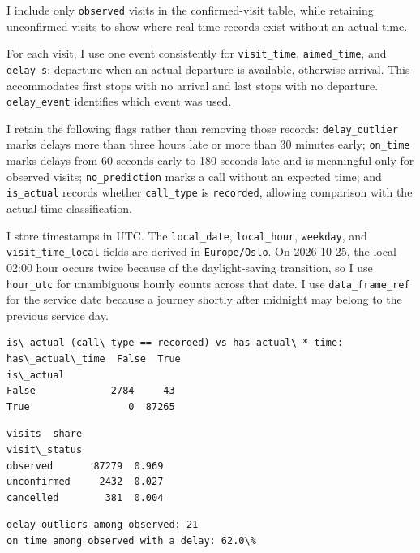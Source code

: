 \documentclass[11pt]{article}
\begin{document}
I include only \texttt{observed} visits in the confirmed-visit table,
while retaining unconfirmed visits to show where real-time records exist
without an actual time.

For each visit, I use one event consistently for \texttt{visit\_time},
\texttt{aimed\_time}, and \texttt{delay\_s}: departure when an actual
departure is available, otherwise arrival. This accommodates first stops
with no arrival and last stops with no departure. \texttt{delay\_event}
identifies which event was used.

I retain the following flags rather than removing those records:
\texttt{delay\_outlier} marks delays more than three hours late or more
than 30 minutes early; \texttt{on\_time} marks delays from 60 seconds
early to 180 seconds late and is meaningful only for observed visits;
\texttt{no\_prediction} marks a call without an expected time; and
\texttt{is\_actual} records whether \texttt{call\_type} is
\texttt{recorded}, allowing comparison with the actual-time
classification.

I store timestamps in UTC. The \texttt{local\_date},
\texttt{local\_hour}, \texttt{weekday}, and \texttt{visit\_time\_local}
fields are derived in \texttt{Europe/Oslo}. On 2026-10-25, the local
02:00 hour occurs twice because of the daylight-saving transition, so I
use \texttt{hour\_utc} for unambiguous hourly counts across that date. I
use \texttt{data\_frame\_ref} for the service date because a journey
shortly after midnight may belong to the previous service day.

    \begin{Verbatim}[commandchars=\\\{\}]
is\_actual (call\_type == recorded) vs has actual\_* time:
has\_actual\_time  False  True
is\_actual
False             2784     43
True                 0  87265
    \end{Verbatim}

    
    \begin{Verbatim}[commandchars=\\\{\}]
              visits  share
visit\_status               
observed       87279  0.969
unconfirmed     2432  0.027
cancelled        381  0.004
    \end{Verbatim}

    
    \begin{Verbatim}[commandchars=\\\{\}]
delay outliers among observed: 21
on time among observed with a delay: 62.0\%
    \end{Verbatim}
\end{document}
